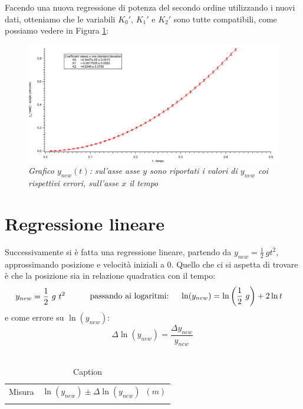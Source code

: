 \documentclass[12pt, a4paper]{article}
\begin{document}
Facendo una nuova regressione di potenza del secondo ordine utilizzando i nuovi dati, otteniamo che le variabili $K_0'$, $K_1'$ e $K_2'$ sono tutte compatibili, come possiamo vedere in Figura \ref{Grafico parabolico}:
\bigskip
\bigskip

    \begin{figure}[h!]
\centering
\includegraphics[width=170mm]{Immagini/Graph1.jpg}
\caption{\textit{{\footnotesize{Grafico $y_{new}(t)$: sul'asse asse $y$ sono riportati i valori di $y_{new}$ coi rispettivi errori, sull'asse $x$ il tempo}}}}
\label{Grafico parabolico}
\end{figure}
\newpage
\section{Regressione lineare}
Successivamente si è fatta una regressione lineare, partendo da $y_{new}= \frac{1}{2}\ g t^2$, approssimando posizione e velocità iniziali a $0$. Quello che ci si aspetta di trovare è che la posizione sia in relazione quadratica con il tempo:
\begin{equation*}
\begin{aligned}
  & y_{new}= \frac{1}{2}\ g\ t^2
  &\quad{} 
  \end{aligned}
  \begin{aligned}
  &&\text{passando ai logaritmi:\phantom{..}}& & \ln(y_{new})=\ln\left({\frac{1}{2}\ g}\right) +2\ln{t}
  &
  \end{aligned}
\end{equation*}
e come errore su $\ln({y_{new}})$: 
\begin{equation*}
    \Delta\ln{(y_{new})}=\frac{\Delta y_{new}}{y_{new}}\ 
\end{equation*}\\

\begin{table}[!h]
    \centering
    \begin{tabular}{|c|c|}
    \hline
    \multirow{2}{*}{\small Misura} 
    &\multirow{2}{*}{\small$\ln({y_{new}}) \pm\Delta\ln{(y_{new})}$\ $(m)$} 
     
    \\
    & 
    \\
    \hline
    \hline
       &   \\
    \hline
    \end{tabular}
        \caption{Caption}
        \label{tab:my_label}
\end{table}
\end{document}

